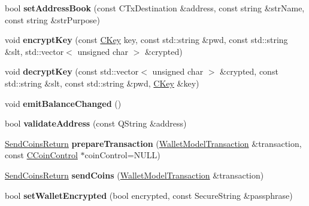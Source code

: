 \begin{DoxyCompactItemize}
bool {\bfseries set\+Address\+Book} (const C\+Tx\+Destination \&address, const string \&str\+Name, const string \&str\+Purpose)
\item 
\mbox{\label{class_wallet_model_ad7d271d5ef11c1ce3b9166f4c8db30db}} 
void {\bfseries encrypt\+Key} (const \mbox{\hyperlink{class_c_key}{C\+Key}} key, const std\+::string \&pwd, const std\+::string \&slt, std\+::vector$<$ unsigned char $>$ \&crypted)
\item 
\mbox{\label{class_wallet_model_a444a7fc1635b32af3e366ea3cfab516d}} 
void {\bfseries decrypt\+Key} (const std\+::vector$<$ unsigned char $>$ \&crypted, const std\+::string \&slt, const std\+::string \&pwd, \mbox{\hyperlink{class_c_key}{C\+Key}} \&key)
\item 
\mbox{\label{class_wallet_model_a7796e14738d2187e2f98def3359b3141}} 
void {\bfseries emit\+Balance\+Changed} ()
\item 
\mbox{\label{class_wallet_model_a04604615253aeaae1253b1412a70a1f7}} 
bool {\bfseries validate\+Address} (const Q\+String \&address)
\item 
\mbox{\label{class_wallet_model_a8abc851901c7c7343ebfb5a8e5fc0154}} 
\mbox{\hyperlink{struct_wallet_model_1_1_send_coins_return}{Send\+Coins\+Return}} {\bfseries prepare\+Transaction} (\mbox{\hyperlink{class_wallet_model_transaction}{Wallet\+Model\+Transaction}} \&transaction, const \mbox{\hyperlink{class_c_coin_control}{C\+Coin\+Control}} $\ast$coin\+Control=N\+U\+LL)
\item 
\mbox{\label{class_wallet_model_a53443aca544c824550f21e5f87e4ec39}} 
\mbox{\hyperlink{struct_wallet_model_1_1_send_coins_return}{Send\+Coins\+Return}} {\bfseries send\+Coins} (\mbox{\hyperlink{class_wallet_model_transaction}{Wallet\+Model\+Transaction}} \&transaction)
\item 
\mbox{\label{class_wallet_model_a444340830badcd48e3a4dd6b03d9c4d7}} 
bool {\bfseries set\+Wallet\+Encrypted} (bool encrypted, const Secure\+String \&passphrase)
\item 
\mbox{\label{class_wallet_model_a5a8b65bfaecb0813d64c733f4f34f090}} 

\end{DoxyCompactItemize}
